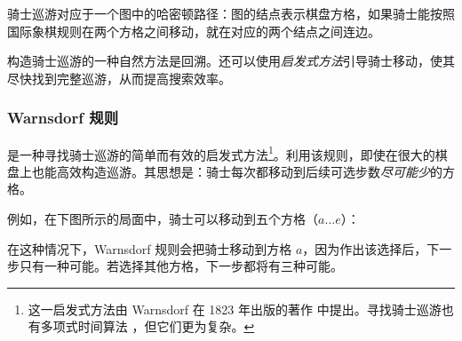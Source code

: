 骑士巡游对应于一个图中的哈密顿路径：图的结点表示棋盘方格，如果骑士能按照国际象棋规则在两个方格之间移动，就在对应的两个结点之间连边。

构造骑士巡游的一种自然方法是回溯。还可以使用\emph{启发式方法}引导骑士移动，使其尽快找到完整巡游，从而提高搜索效率。

\subsubsection{Warnsdorf 规则}


是一种寻找骑士巡游的简单而有效的启发式方法\footnote{这一启发式方法由 Warnsdorf 在 1823 年出版的著作 \cite{war23} 中提出。寻找骑士巡游也有多项式时间算法 \cite{par97}，但它们更为复杂。}。利用该规则，即使在很大的棋盘上也能高效构造巡游。其思想是：骑士每次都移动到后续可选步数\emph{尽可能少}的方格。

例如，在下图所示的局面中，骑士可以移动到五个方格（$a \ldots e$）：
\begin{center}
\end{center}
在这种情况下，Warnsdorf 规则会把骑士移动到方格 $a$，因为作出该选择后，下一步只有一种可能。若选择其他方格，下一步都将有三种可能。
